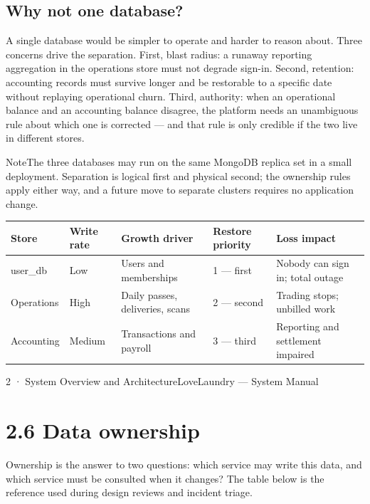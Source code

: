 \documentclass[11pt,a4paper,oneside]{book}
\begin{document}
\subsection*{Why not one database?}
A single database would be simpler to operate and harder to reason about. Three concerns drive the separation. First, blast radius: a runaway reporting aggregation in the operations store must not degrade sign-in. Second, retention: accounting records must survive longer and be restorable to a specific date without replaying operational churn. Third, authority: when an operational balance and an accounting balance disagree, the platform needs an unambiguous rule about which one is corrected — and that rule is only credible if the two live in different stores.

\begin{notebox}NoteThe three databases may run on the same MongoDB replica set in a small deployment. Separation is logical first and physical second; the ownership rules apply either way, and a future move to separate clusters requires no application change.\end{notebox}
\begin{center}\small
\begin{tabularx}{\linewidth}{|X|X|X|X|X|}
\hline
\rowcolor{lightgrey}
\textbf{Store} & \textbf{Write rate} & \textbf{Growth driver} & \textbf{Restore priority} & \textbf{Loss impact} \\ \hline
user\_db & Low & Users and memberships & 1 — first & Nobody can sign in; total outage \\ \hline
Operations & High & Daily passes, deliveries, scans & 2 — second & Trading stops; unbilled work \\ \hline
Accounting & Medium & Transactions and payroll & 3 — third & Reporting and settlement impaired \\ \hline
\end{tabularx}
\end{center}
2 · System Overview and ArchitectureLoveLaundry — System Manual

\section{2.6 Data ownership}
Ownership is the answer to two questions: which service may write this data, and which service must be consulted when it changes? The table below is the reference used during design reviews and incident triage.
\end{document}
